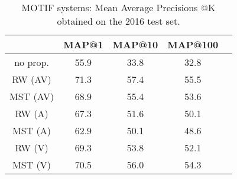 \begin{table}[!t]
\caption{MOTIF systems: Mean Average Precisions @K obtained on the 2016 test set.}

\label{tab:MOTIF_perfs}
\centering
\begin{tabular}{|c||c|c|c|c|}
\hline
           & MAP@1& MAP@10& MAP@100  \\ \hline
\hline
\hline
no prop.   & 55.9 &  33.8 & 32.8\\ \hline
\hline
RW (AV)    & 71.3 &  57.4 & 55.5\\ \hline
MST (AV)   & 68.9 &  55.4 & 53.6\\ \hline
\hline
RW (A)     & 67.3 &  51.6 & 50.1\\ \hline
MST (A)    & 62.9 &  50.1 & 48.6 \\ \hline
\hline
RW (V)     & 69.3  & 53.8 & 52.1 \\ \hline
MST (V)    & 70.5  & 56.0 & 54.3 \\ \hline


\end{tabular}
\end{table}

\endinput